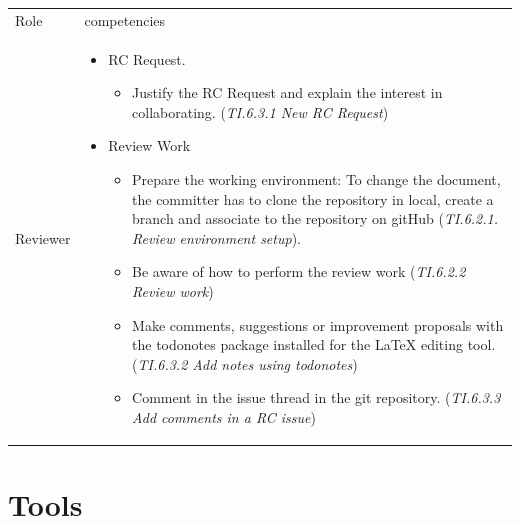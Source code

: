 \documentclass{template/openetcs_article}
\begin{document}
\begin{flushleft}

\begin{tabular}{|m{3cm}|m{11cm}|}
\hline
\rowcolor{myblue}
\multicolumn{2}{|c|}{Roles} \\\hline
\rowcolor{lightgray}
Role &
competencies 
\\\hline
Reviewer &
\begin{itemize}
\item RC Request.
\begin{itemize}
\item Justify the RC Request and explain the interest in collaborating. ({\it TI.6.3.1 New RC Request})
\end{itemize}
\item Review Work
\begin{itemize}
\item Prepare the working environment: To change the document, the committer has to clone the repository in local, create a branch and associate to the repository on gitHub ({\it TI.6.2.1. Review environment setup}).
\item Be aware of how to perform the review work ({\it TI.6.2.2 Review work})
\item Make comments, suggestions or improvement proposals with the todonotes package installed for the LaTeX editing tool. ({\it TI.6.3.2 Add notes using todonotes})
\item Comment in the issue thread in the git repository. ({\it TI.6.3.3 Add comments in a RC issue})
\end{itemize}
\end{itemize}
\\\hline
\end{tabular}
\end{flushleft}


\section{Tools}
\end{document}
